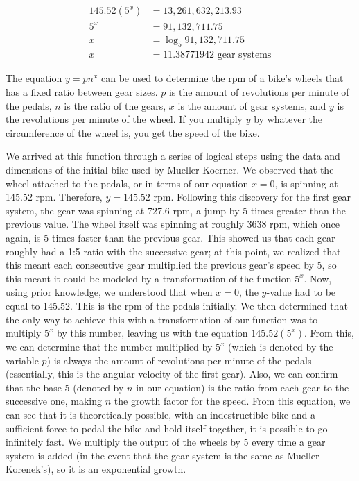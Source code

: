 \documentclass{article}
\begin{document}
\begin{align*}
    145.52(5^{x}) &= 13,261,632,213.93 \\
    5^{x} &= 91,132,711.75  \\
    x &= \log_5 91,132,711.75  \\
    x &= 11.38771942 \text{ gear systems}
\end{align*}

The equation $y=pn^{x}$ can be used to determine the rpm of a bike’s wheels that has a fixed ratio between gear sizes. $p$ is the amount of revolutions per minute of the pedals, $n$ is the ratio of the gears, $x$ is the amount of gear systems, and $y$ is the revolutions per minute of
the wheel. If you multiply $y$ by whatever the circumference of the wheel is, you get the speed of the bike.  

We arrived at this function through a series of logical steps using the data and  dimensions of the initial bike used by Mueller-Koerner. We observed that the wheel attached to  the pedals, or in terms of our equation $x=0$, is spinning at 145.52 rpm.  Therefore, $y=145.52$ rpm. Following this discovery for the first gear system, the gear was spinning at 727.6 rpm, a jump by 5 times greater than the previous value. The wheel itself was spinning at roughly 3638 rpm, which once again, is 5 times faster than the previous gear. This showed us that each gear roughly had a 1:5 ratio with the successive gear; at this point, we realized that this meant each consecutive gear multiplied the previous gear’s speed by 5, so this meant it could be modeled by a transformation of the function $5^{x}$. Now, using prior knowledge, we understood that when $x=0$, the $y$-value had to be equal to 145.52. This is the rpm of the pedals initially. We then determined that the only way to achieve this with a transformation  of our function was to multiply $5^{x}$ by this number, leaving us with the equation $145.52(5^{x})$. From this, we can determine that the number multiplied by $5^{x}$ (which is denoted by the variable $p$) is always the amount of revolutions per minute of the pedals (essentially, this is the angular velocity  of the first gear). Also, we can confirm that the base 5 (denoted by $n$ in our equation) is the ratio  from each gear to the successive one, making $n$ the growth factor for the speed.  
From this equation, we can see that it is theoretically possible, with an indestructible bike and a sufficient force to pedal the bike and hold itself together, it is possible to go infinitely fast.  We multiply the output of the wheels by 5 every time a gear system is added (in the event that the gear system is the same as Mueller-Korenek’s), so it is an exponential growth. 
\end{document}

